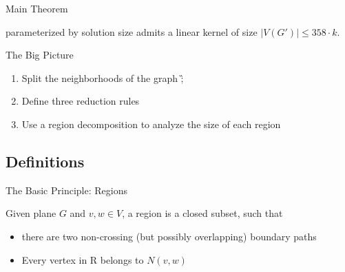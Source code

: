 \begin{frame}[c]{Main Theorem}
\begin{tcolorbox}[colback=TUMBlueLighter,title=The Main Theorem]\label{main}
    \psdom parameterized by solution size admits a linear kernel of size $|V(G')| \leq 358 \cdot k$.

\end{tcolorbox}
\end{frame}

\begin{frame}[c]{The Big Picture}

    \begin{enumerate}
     \pause   \item Split the neighborhoods of the graph \G;
     \pause   \item Define three reduction rules
     \pause   \item Use a region decomposition to analyze the size of each region
    \end{enumerate}
\end{frame}

\subsection{Definitions}
\begin{frame}[c]{The Basic Principle: Regions}

    \begin{tcolorbox}[colback=TUMBlueLighter,title=Region (Simplified)]
        Given plane $G$ and $v,w \in V$, a region is a closed subset, such that
        \begin{itemize}
            \item there are two non-crossing (but possibly overlapping) boundary paths
            \item Every vertex in R belongs to $N(v,w)$
        \end{itemize}
    \end{tcolorbox}
    \pause \begin{figure}[!ht]
        \end{figure}
\end{frame}

